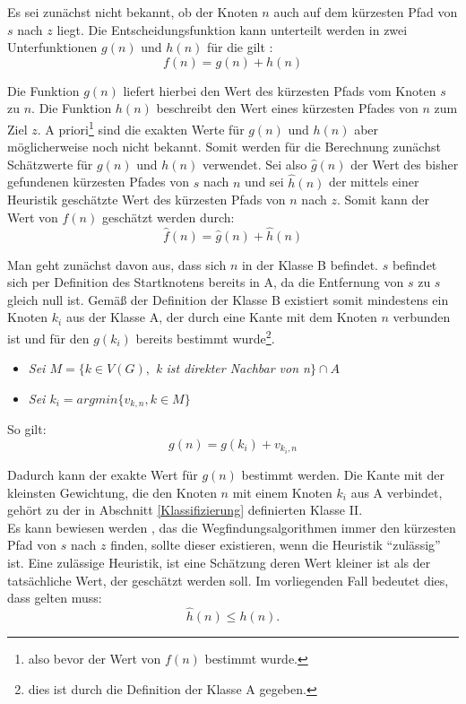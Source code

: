 		Es sei zunächst nicht bekannt, ob der Knoten $n$ auch auf dem kürzesten Pfad von $s$ nach $z$ liegt.
		Die Entscheidungsfunktion kann unterteilt werden in zwei Unterfunktionen $g(n)$ und $h(n)$ für die gilt \cite{Hart1968}:
		\begin{equation}
		f(n)=g(n)+h(n)
		\end{equation}
		
		Die Funktion $g(n)$ liefert hierbei den Wert des kürzesten Pfads vom Knoten $s$ zu $n$. Die Funktion $h(n)$ beschreibt den Wert eines kürzesten Pfades von $n$ zum Ziel $z$. A priori\footnote{also bevor der Wert von $f(n)$ bestimmt wurde.} sind die exakten Werte für $g(n)$ und $h(n)$ aber möglicherweise noch nicht bekannt. Somit werden für die Berechnung zunächst Schätzwerte für $g(n)$ und $h(n)$ verwendet. Sei also $\hat{g}(n)$ der Wert des bisher gefundenen kürzesten Pfades von $s$ nach $n$ und sei $\hat{h}(n)$ der mittels einer Heuristik geschätzte Wert des kürzesten Pfads von $n$ nach $z$. Somit kann der Wert von $f(n)$ geschätzt werden durch:
		\begin{equation}
			\hat{f}(n)=\hat{g}(n)+\hat{h}(n)
		\end{equation}
	
		Man geht zunächst davon aus, dass sich $n$ in der Klasse B befindet. $s$ befindet sich per Definition des Startknotens bereits in A, da die Entfernung von $s$ zu $s$ gleich null ist. Gemäß der Definition der Klasse B existiert somit mindestens ein Knoten $k_i$ aus der Klasse A, der durch eine Kante mit dem Knoten $n$ verbunden ist und für den $g(k_i)$ bereits bestimmt wurde\footnote{dies ist durch die Definition der Klasse A gegeben.}.
		\begin{itemize}
			\item \textit{Sei $M=\{k\in V(G),$ k ist direkter Nachbar von n$\} \cap A$}
			\item \textit{Sei $k_i=arg min\{v_{k,n},k\in M\}$}
		\end{itemize}
		 So gilt:
		\begin{equation}
			g(n)=g(k_i)+v_{k_i,n}
		\end{equation}
		
		Dadurch kann der exakte Wert für $g(n)$ bestimmt werden. Die Kante mit der kleinsten Gewichtung, die den Knoten $n$ mit einem Knoten $k_i$ aus A verbindet, gehört zu der in Abschnitt \ref{Klassifizierung} definierten Klasse II.\\
		Es kann bewiesen werden \cite{Hart1968}, das die Wegfindungsalgorithmen immer den kürzesten Pfad von $s$ nach $z$ finden, sollte dieser existieren, wenn die Heuristik "`zulässig"' ist. Eine zulässige Heuristik, ist eine Schätzung deren Wert kleiner ist als der tatsächliche Wert, der geschätzt werden soll. Im vorliegenden Fall bedeutet dies, dass gelten muss:
		\begin{equation}
			\hat{h}(n)\le h(n).
		\end{equation}
		
